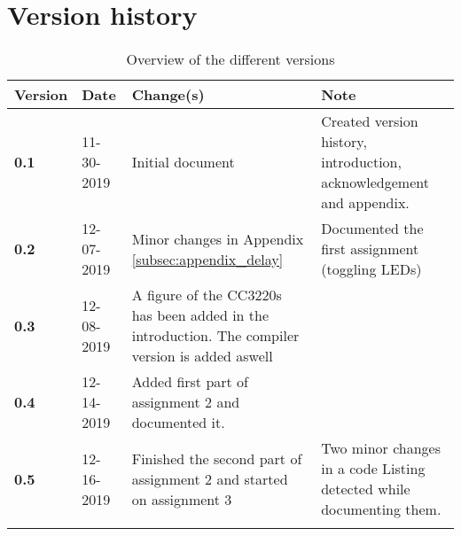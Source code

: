 \section*{Version history}


\begin{longtable}{| p{} | p{} | p{} | p{} |}

    \hline
    \textcolor{darkpink}{Version} & \textcolor{darkpink}{Date} & \textcolor{darkpink}{Change(s)} & \textcolor{darkpink}{Note} \\
     
    \hline
    \textbf{0.1} & 11-30-2019 & Initial document & Created version history, introduction, acknowledgement and appendix. \\

    \hline

    \textbf{0.2} & 12-07-2019 & Minor changes in Appendix \ref{subsec:appendix_delay} & Documented the first assignment (toggling LEDs) \\

    \hline

    \textbf{0.3} & 12-08-2019 & A figure of the CC3220s has been added in the introduction. The compiler version is added aswell & \\
    \hline

    \textbf{0.4} & 12-14-2019 & Added first part of assignment 2 and documented it. & \\

    \hline

    \textbf{0.5} & 12-16-2019 & Finished the second part of assignment 2 and started on assignment 3 & Two minor changes in a code Listing detected while documenting them. \\

    \hline

    \caption{Overview of the different versions}
    \label{tab:version}

\end{longtable}
